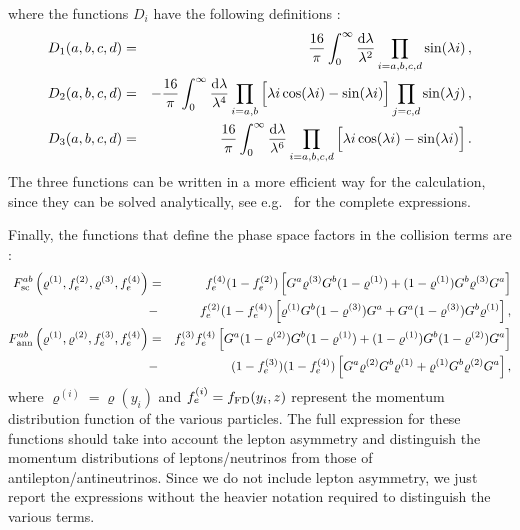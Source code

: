 \documentclass[notitlepage,showpacs,preprintnumbers,amsmath,amssymb,superscriptaddress,prd,onecolumn]{revtex4-1}
\begin{document}
%
where the functions $D_i$ have the following definitions \cite{Dolgov:1997mb}:
%
\begin{eqnarray}
D_1(a,b,c,d)
&=&
\frac{16}{\pi}
\int_0^\infty
\frac{{\rm d}\lambda}{\lambda^2}
\prod_{i=a,b,c,d}\sin(\lambda i)
\,,\\
D_2(a,b,c,d)
&=&
-\frac{16}{\pi}
\int_0^\infty
\frac{{\rm d}\lambda}{\lambda^4}
\prod_{i=a,b}\Big[\lambda i \cos(\lambda i)-\sin(\lambda i)\Big]
\prod_{j=c,d}\sin(\lambda j)
\,,\\
D_3(a,b,c,d)
&=&
\frac{16}{\pi}
\int_0^\infty
\frac{\mathrm{d}\lambda}{\lambda^6}
\prod_{i=a,b,c,d}\Big[\lambda i \cos(\lambda i)-\sin(\lambda i)\Big]
\,.
\end{eqnarray}
The three functions can be written in a more efficient way for the calculation,
since they can be solved analytically, see e.g.~\cite{Blaschke:2016xxt} for the complete expressions.

Finally, the functions that define the phase space factors in the collision terms are \cite{deSalas:2016ztq}:
\begin{eqnarray}
F_{\rm sc}^{ab}\left(\varrho^{(1)}, f_e^{(2)}, \varrho^{(3)}, f_e^{(4)}\right)
&=&
f_e^{(4)}(1-f_e^{(2)})\left[G^a\varrho^{(3)}G^b(1-\varrho^{(1)})+(1-\varrho^{(1)})G^b\varrho^{(3)}G^a\right]
\nonumber\\
&-&
f_e^{(2)}(1-f_e^{(4)})\left[\varrho^{(1)}G^b(1-\varrho^{(3)})G^a+G^a(1-\varrho^{(3)})G^b\varrho^{(1)}\right],
\label{eq:F_ab_sc}\\
F_{\rm ann}^{ab}\left(\varrho^{(1)}, \varrho^{(2)}, f_e^{(3)}, f_e^{(4)}\right)
&=&
f_e^{(3)}f_e^{(4)}\left[G^a(1-\varrho^{(2)})G^b(1-\varrho^{(1)})+(1-\varrho^{(1)})G^b(1-\varrho^{(2)})G^a\right]
\nonumber\\
&-&
(1-f_e^{(3)})(1-f_e^{(4)})\left[G^a\varrho^{(2)}G^b\varrho^{(1)}+\varrho^{(1)}G^b\varrho^{(2)}G^a\right],
\label{eq:F_ab_ann}
\end{eqnarray}
where $\varrho^{(i)}=\varrho(y_i)$ and $f_e^{(i)}=f_{\rm FD}(y_i, z)$ represent the momentum distribution function
of the various particles.
The full expression for these functions should take into account the lepton asymmetry and distinguish
the momentum distributions of leptons/neutrinos from those of antilepton/antineutrinos.
Since we do not include lepton asymmetry, we just report the expressions without the heavier notation
required to distinguish the various terms.
\end{document}
